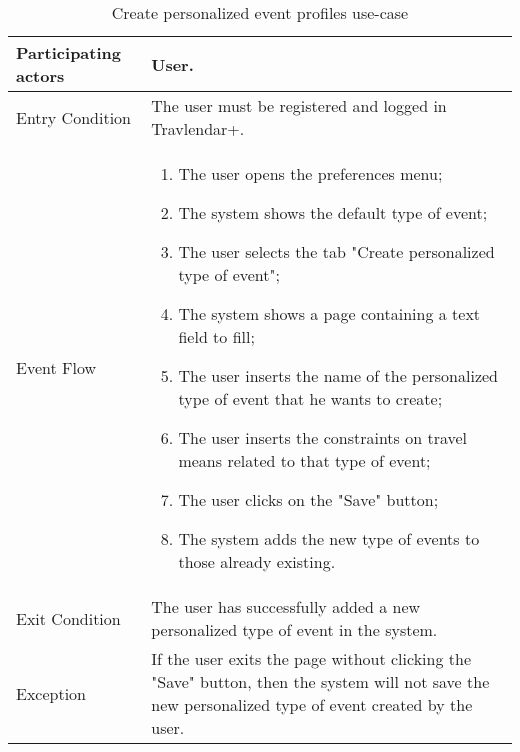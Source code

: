 \begin{table}[H]
	\begin{center}
		\begin{tabular}{ | p{} | p{} | }
		\hline
		Participating actors & User.\\
		\hline
		Entry Condition & The user must be registered and logged in Travlendar+.\\
		\hline
		Event Flow & 
			\begin{enumerate}
				\item The user opens the preferences menu;
				\item The system shows the default type of event;
				\item The user selects the tab "Create personalized type of event";
				\item The system shows a page containing a text field to fill;
				\item The user inserts the name of the personalized type of event that he wants to create;
				\item The user inserts the constraints on travel means related to that type of event;
				\item The user clicks on the "Save" button;
				\item The system adds the new type of events to those already existing.

			\end{enumerate} \\
		\hline
		Exit Condition & The user has successfully added a new personalized type of event in the system.\\
		\hline
		Exception & If the user exits the page without clicking the "Save" button, then the system will not save the new personalized type of event created by the user.\\ 
		\hline
		\end{tabular}
	\end{center}
	\caption{Create personalized event profiles use-case}
\end{table}